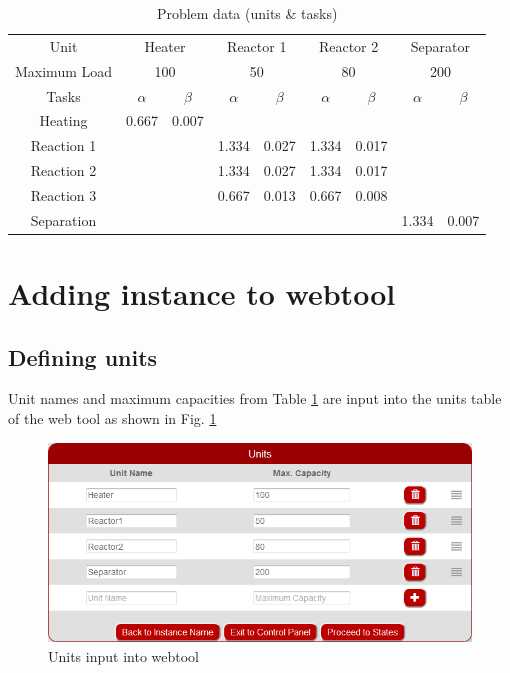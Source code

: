 \begin{table}[htbp]
\centering
\caption{Problem data (units \& tasks)}
\label{tab:tasks}
\begin{tabular}{@{}ccccccccc@{}}
\toprule
Unit         & \multicolumn{2}{c}{Heater} & \multicolumn{2}{c}{Reactor 1} & \multicolumn{2}{c}{Reactor 2} & \multicolumn{2}{c}{Separator} \\ \cmidrule(l){2-9} 
Maximum Load & \multicolumn{2}{c}{100}    & \multicolumn{2}{c}{50}        & \multicolumn{2}{c}{80}        & \multicolumn{2}{c}{200}       \\ \midrule
Tasks        & $\alpha$       & $\beta$       & $\alpha$         & $\beta$        & $\alpha$         & $\beta$        & $\alpha$         & $\beta$        \\ \cmidrule(l){2-9} 
Heating      & 0.667        & 0.007       &                &              &                &              &                &              \\
Reaction 1   &              &             & 1.334          & 0.027        & 1.334          & 0.017        &                &              \\
Reaction 2   &              &             & 1.334          & 0.027        & 1.334          & 0.017        &                &              \\
Reaction 3   &              &             & 0.667          & 0.013        & 0.667          & 0.008        &                &              \\
Separation   &              &             &                &              &                &              & 1.334          & 0.007        \\ \bottomrule
\end{tabular}
\end{table}

\section{Adding instance to webtool}
\subsection{Defining units}

Unit names and maximum capacities from Table \ref{tab:tasks} are input into the units table of the web tool as shown in Fig. \ref{fig:defUnits}

\begin{figure}[htbp]
\centering
\includegraphics[width=\linewidth]{Images/DefineUnits.png}
\caption{Units input into webtool}
\label{fig:defUnits}
\end{figure}

